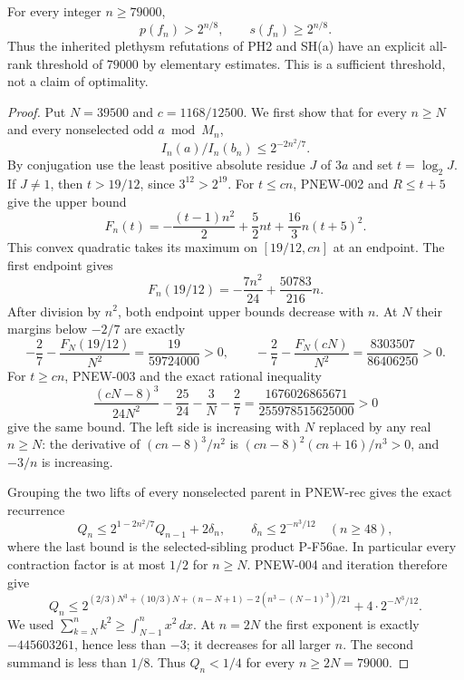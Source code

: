 \begin{theorem}
For every integer $n\ge79000$,
\[
                  p(f_n)>2^{n/8},\qquad s(f_n)\ge2^{n/8}.
\]
Thus the inherited plethysm refutations of PH2 and SH(a) have an
explicit all-rank threshold of $79000$ by elementary estimates.
This is a sufficient threshold, not a claim of optimality.
\end{theorem}
\begin{proof}
Put $N=39500$ and $c=1168/12500$.  We first show that for every $n\ge N$ and
every nonselected odd $a\bmod M_n$,
\[
                   I_n(a)/I_n(b_n)\le2^{-2n^2/7}.
\]
By conjugation use the least positive absolute residue
$J$ of $3a$ and set $t=\log_2J$.  If $J\ne1$, then
$t>19/12$, since $3^{12}>2^{19}$.  For $t\le cn$, PNEW-002 and $R\le t+5$ give
the upper bound
\[
 F_n(t)=-\frac{(t-1)n^2}{2}
          +\frac52nt+\frac{16}{3}n(t+5)^2.
\]
This convex quadratic takes its maximum on
$[19/12,cn]$ at an endpoint.  The first endpoint gives
\[
 F_n(19/12)=-\frac{7n^2}{24}+\frac{50783}{216}n.
\]
After division by $n^2$, both endpoint upper bounds decrease
with $n$.  At $N$ their margins below $-2/7$ are exactly
\[
 -\frac27-\frac{F_N(19/12)}{N^2}
       =\frac{19}{59724000}>0,\qquad
 -\frac27-\frac{F_N(cN)}{N^2}
       =\frac{8303507}{86406250}>0.
\]
For $t\ge cn$, PNEW-003 and the exact rational inequality
\[
 \frac{(cN-8)^3}{24N^2}-\frac{25}{24}-\frac3N-\frac27
       =\frac{1676026865671}{255978515625000}>0
\]
give the same bound.  The left side is increasing with $N$
replaced by any real $n\ge N$: the derivative of
$(cn-8)^3/n^2$ is $(cn-8)^2(cn+16)/n^3>0$,
and $-3/n$ is increasing.

Grouping the two lifts of every nonselected parent in
PNEW-rec gives the exact recurrence
\[
 Q_n\le2^{1-2n^2/7}Q_{n-1}+2\delta_n,\qquad
 \delta_n\le2^{-n^3/12}\quad(n\ge48),
\]
where the last bound is the selected-sibling product P-F56ae.
In particular every contraction factor is at most $1/2$ for
$n\ge N$.  PNEW-004 and iteration therefore give
\[
 Q_n\le
 2^{(2/3)N^3+(10/3)N+(n-N+1)-2(n^3-(N-1)^3)/21}
                  +4\cdot2^{-N^3/12}.
\]
We used
$\sum_{k=N}^n k^2\ge\int_{N-1}^{n}x^2\,dx$.
At $n=2N$ the first exponent is exactly
$-445603261$, hence less than $-3$; it decreases for
all larger $n$.  The second summand is less than $1/8$.
Thus $Q_n<1/4$ for every $n\ge2N=79000$.


\end{proof}
